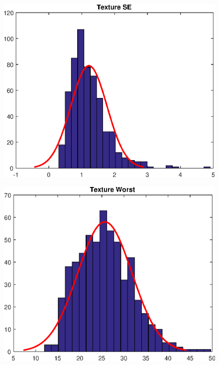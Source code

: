 \documentclass[11pt,a4paper]{article}
\numberwithin{equation}{section}
\begin{document}
\begin{itemize}
\begin{figure}[H]
\centering
\begin{minipage}{.5\textwidth}
  \centering
  \includegraphics[width=\linewidth]{./img/texture_se}
  \label{fig:test1}
\end{minipage}%
\begin{minipage}{.5\textwidth}
  \centering
  \includegraphics[width=\linewidth]{./img/texture_worst}
  \label{fig:test2}
\end{minipage}
\end{figure}


\end{itemize}
\end{document}
